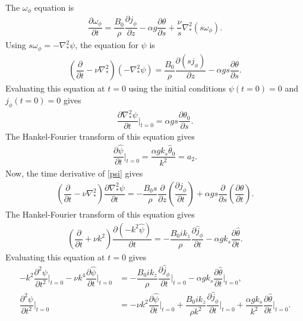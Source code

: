 \documentclass[12pt,psfig]{article}
\begin{document}
The $\omega_\phi$ equation is
\begin{align*}
\dfrac{\partial \omega_\phi}{\partial t}=\dfrac{B_0}{\rho}\dfrac{\partial j_\phi}{\partial z}-\alpha g \dfrac{\partial \theta}{\partial s}+\dfrac{\nu}{s}\nabla^2_*(s\omega_\phi).
\end{align*}
Using $s\omega_\phi=-\nabla^2_*\psi$, the equation for $\psi$ is
\begin{align}
\left(\dfrac{\partial }{\partial t}-\nu\nabla^2_*\right)(-\nabla^2_*\psi)=\dfrac{B_0}{\rho}\dfrac{\partial (sj_\phi)}{\partial z}-\alpha g s\dfrac{\partial \theta}{\partial s}.\label{psi}
\end{align}
Evaluating this equation at $t=0$ using the initial conditions $\psi(t=0)=0$ and $j_\phi(t=0)=0$ gives
\begin{align*}
\dfrac{\partial \nabla^2_*\psi}{\partial t}\bigg|_{t=0}=\alpha g s\dfrac{\partial \theta_0}{\partial s}.
\end{align*}
The Hankel-Fourier transform of this equation gives
\begin{align}
\dfrac{\partial \hat{\psi}}{\partial t}\bigg|_{t=0}= \dfrac{\alpha g k_s\hat{\theta}_0}{k^2}=a_2. \label{dpsidt}
\end{align}
Now, the time derivative of \eqref{psi} gives
\begin{align*}
\left(\dfrac{\partial }{\partial t}-\nu\nabla^2_*\right)\dfrac{\partial \nabla^2_*\psi}{\partial t}=-\dfrac{B_0s}{\rho}\dfrac{\partial }{\partial z}\left(\dfrac{\partial j_\phi}{\partial t}\right)+\alpha g s\dfrac{\partial }{\partial s}\left(\dfrac{\partial \theta}{\partial t}\right).
\end{align*}
The Hankel-Fourier transform of this equation gives
\begin{align*}
	\left(\dfrac{\partial }{\partial t}+\nu k^2\right)\dfrac{\partial (-k^2\hat{\psi})}{\partial t}=-\dfrac{B_0 i k_z}{\rho}\dfrac{\partial \hat{j}_\phi}{\partial t}-\alpha g k_s\dfrac{\partial \hat{\theta}}{\partial t}.
\end{align*}
Evaluating this equation at $t=0$ gives
\begin{align*}
-k^2\dfrac{\partial^2\psi }{\partial t^2}\bigg|_{t=0}-\nu k^4\dfrac{\partial \hat{\psi}}{\partial t}\bigg|_{t=0}&=-\dfrac{B_0 i k_z}{\rho}\dfrac{\partial \hat{j}_\phi}{\partial t}\bigg|_{t=0}-\alpha g k_s\dfrac{\partial \hat{\theta}}{\partial t}\bigg|_{t=0},\\
\dfrac{\partial^2\psi }{\partial t^2}\bigg|_{t=0}&=-\nu k^2\dfrac{\partial \hat{\psi}}{\partial t}\bigg|_{t=0}+\dfrac{B_0 i k_z}{\rho k^2}\dfrac{\partial \hat{j}_\phi}{\partial t}\bigg|_{t=0}+\dfrac{\alpha g k_s}{k^2}\dfrac{\partial \hat{\theta}}{\partial t}\bigg|_{t=0}.
\end{align*}
\end{document}
